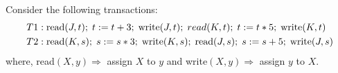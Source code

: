 



\ADD\vc\vd\s
\MULTIPLY\vc\vd\m

\question Consider the following transactions:
\begin{align}
  T1:\;&\text{read}(J,t);\;t:=t+3;\;\text{write}(J,t);\;
    {read}(K,t);\;t:=t*5;\;\text{write}(K,t) \nonumber \\
  T2:\;&\text{read}(K,s);\;s:=s*3;\;\text{write}(K,s);\;
    \text{read}(J,s);\;s:=s+5;\;\text{write}(J,s) \nonumber
\end{align}
where, read$(X,y)\Rightarrow$ assign $X$ to $y$ and 
write$(X,y)\Rightarrow$ assign $y$ to $X$.

\watchout

